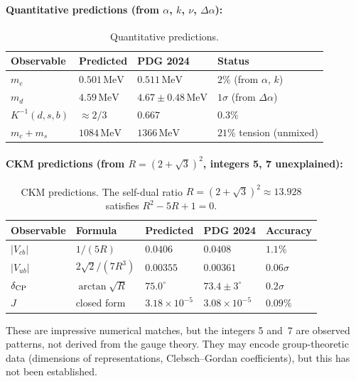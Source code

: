 \documentclass[12pt,a4paper]{article}
\newcommand{\MeV}{\,\mathrm{MeV}}
\begin{document}
\paragraph{Quantitative predictions (from $\alpha$, $k$, $\nu$, $\Delta\alpha$):}

\begin{table}[h]
\centering
\caption{Quantitative predictions.}
\begin{tabular}{llll}
  \toprule
  Observable & Predicted & PDG 2024 & Status \\
  \midrule
  $m_e$ & $0.501\MeV$ & $0.511\MeV$ & $2\%$ (from $\alpha$, $k$) \\
  $m_d$ & $4.59\MeV$ & $4.67 \pm 0.48\MeV$ & $1\sigma$ (from $\Delta\alpha$) \\
  $K^{-1}(d,s,b)$ & $\approx 2/3$ & $0.667$ & $0.3\%$ \\
  $m_c + m_s$ & $1084\MeV$ & $1366\MeV$ & $21\%$ tension (unmixed) \\
  \bottomrule
\end{tabular}
\end{table}

\paragraph{CKM predictions (from $R = (2+\sqrt{3})^2$, integers 5, 7 unexplained):}

\begin{table}[h]
\centering
\caption{CKM predictions.  The self-dual ratio
$R = (2+\sqrt{3})^2 \approx 13.928$ satisfies $R^2 - 5R + 1 = 0$.}
\begin{tabular}{lllll}
  \toprule
  Observable & Formula & Predicted & PDG 2024 & Accuracy \\
  \midrule
  $|V_{cb}|$ & $1/(5R)$ & $0.0406$ & $0.0408$ & $1.1\%$ \\
  $|V_{ub}|$ & $2\sqrt{2}/(7R^3)$ & $0.00355$ & $0.00361$ & $0.06\sigma$ \\
  $\delta_{\rm CP}$ & $\arctan\sqrt{R}$ & $75.0^\circ$ & $73.4 \pm 3^\circ$ & $0.2\sigma$ \\
  $J$ & closed form & $3.18 \times 10^{-5}$ & $3.08 \times 10^{-5}$ & $0.09\%$ \\
  \bottomrule
\end{tabular}
\end{table}

\noindent These are impressive numerical matches, but the integers 5 and~7
are observed patterns, not derived from the gauge theory.  They may encode
group-theoretic data (dimensions of representations, Clebsch--Gordan
coefficients), but this has not been established.
\end{document}
